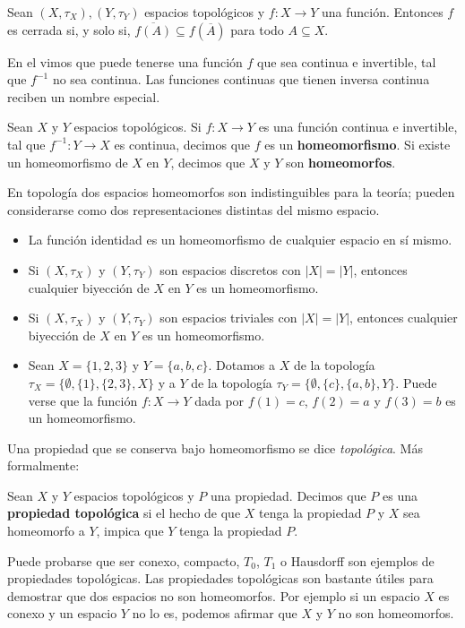 \begin{Prop}
   Sean $(X,\tau_X), (Y,\tau_Y)$ espacios topológicos y $f:X\to Y$ una función. Entonces $f$ es cerrada si, y solo si, $\overline{f(A)}\subseteq f(\overline{A})$ para todo $A\subseteq X$. 
\end{Prop}
En el  vimos que puede tenerse una función $f$ que sea continua e invertible, tal que $f^{-1}$ no sea continua. Las funciones continuas que tienen inversa continua reciben un nombre especial.
\begin{Def}
   Sean $X$ y $Y$ espacios topológicos. Si $f:X\to Y$ es una función continua e invertible, tal que $f^{-1}:Y\to X$ es continua, decimos que $f$ es un \textbf{homeomorfismo}. Si existe un homeomorfismo de $X$ en $Y$, decimos que $X$ y $Y$ son \textbf{homeomorfos}. 
\end{Def}
En topología dos espacios homeomorfos son indistinguibles para la teoría; pueden considerarse como dos representaciones distintas del mismo espacio.
\begin{Ejm}
   \phantom{o}
   \begin{itemize}
      \item La función identidad es un homeomorfismo de cualquier espacio en sí mismo.
      \item Si $(X,\tau_X)$ y $(Y,\tau_Y)$ son espacios discretos con $|X|=|Y|$, entonces cualquier biyección de $X$ en $Y$ es un homeomorfismo.
      \item Si $(X,\tau_X)$ y $(Y,\tau_Y)$ son espacios triviales con $|X|=|Y|$, entonces cualquier biyección de $X$ en $Y$ es un homeomorfismo.
      \item Sean $X = \{1, 2, 3\}$ y $Y = \{a, b, c\}$. Dotamos a $X$ de la topología $\tau_X = \{\emptyset, \{1\},\allowbreak \{2, 3\},\allowbreak X\}$ y a $Y$ de la topología $\tau_Y = \{\emptyset, \{c\}, \{a, b\}, Y\}$. Puede verse que la función $f: X \to Y$ dada por $f(1) = c$, $f(2) = a$ y $f(3) = b$ es un homeomorfismo.
   \end{itemize}
\end{Ejm}
Una propiedad que se conserva bajo homeomorfismo se dice \textit{topológica}. Más formalmente:
\begin{Def}
   Sean $X$ y $Y$ espacios topológicos y $P$ una propiedad. Decimos que $P$ es una \textbf{propiedad topológica} si el hecho de que $X$ tenga la propiedad $P$ y $X$ sea homeomorfo a $Y$, impica que $Y$ tenga la propiedad $P$.
\end{Def}
Puede probarse que ser conexo, compacto, $T_0$, $T_1$ o Hausdorff son ejemplos de propiedades topológicas. Las propiedades topológicas son bastante útiles para demostrar que dos espacios no son homeomorfos. Por ejemplo si un espacio $X$ es conexo y un espacio $Y$ no lo es, podemos afirmar que $X$ y $Y$ no son homeomorfos.
